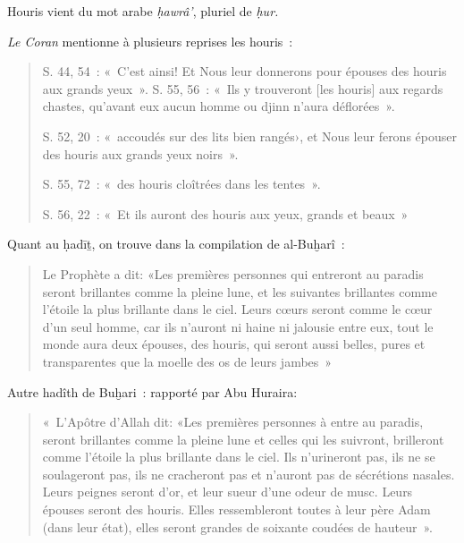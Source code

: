 
Houris vient du mot arabe \emph{ḥawrâ'}, pluriel de \emph{ḥur.}

\emph{Le Coran} mentionne à plusieurs reprises les houris~:
\begin{quote}
   S. 44, 54~: «~C'est ainsi! Et Nous leur donnerons pour épouses des
houris aux grands yeux~». 
S. 55, 56~: «~Ils y trouveront {[}les houris{]} aux regards chastes,
qu'avant eux aucun homme ou djinn n'aura déflorées~».

S. 52, 20~: «~accoudés sur des lits bien rangés›, et Nous leur ferons
épouser des houris aux grands yeux noirs~».

S. 55, 72~: «~des houris cloîtrées dans les tentes~».

S. 56, 22~: «~Et ils auront des houris aux yeux, grands et beaux~»
\end{quote}




Quant au ḥadīṯ, on trouve dans la compilation de al-Buḫarî~:
\begin{quote}
    Le Prophète a dit: «Les premières personnes qui entreront au paradis
seront brillantes comme la pleine lune, et les suivantes brillantes
comme l'étoile la plus brillante dans le ciel. Leurs cœurs seront comme
le cœur d'un seul homme, car ils n'auront ni haine ni jalousie entre
eux, tout le monde aura deux épouses, des houris, qui seront aussi
belles, pures et transparentes que la moelle des os de leurs jambes~»

\end{quote}


Autre hadîth de Buḫari~: rapporté par Abu Huraira: 
\begin{quote}
    «~L'Apôtre d'Allah
dit: «Les premières personnes à entre au paradis, seront brillantes
comme la pleine lune et celles qui les suivront, brilleront comme
l'étoile la plus brillante dans le ciel. Ils n'urineront pas, ils ne se
soulageront pas, ils ne cracheront pas et n'auront pas de sécrétions
nasales. Leurs peignes seront d'or, et leur sueur d'une odeur de musc.
Leurs épouses seront des houris. Elles ressembleront toutes à leur père
Adam (dans leur état), elles seront grandes de soixante coudées de
hauteur~».
\end{quote}


